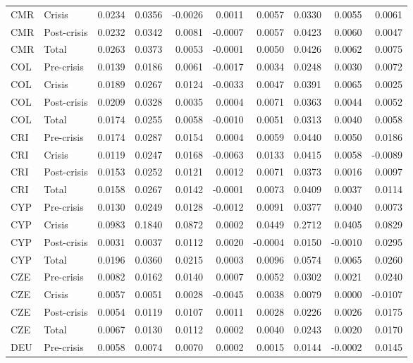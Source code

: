 \begin{longtable}[t]{llrrrrrrrr}
CMR & Crisis & 0.0234 & 0.0356 & -0.0026 & 0.0011 & 0.0057 & 0.0330 & 0.0055 & 0.0061\\
CMR & Post-crisis & 0.0232 & 0.0342 & 0.0081 & -0.0007 & 0.0057 & 0.0423 & 0.0060 & 0.0047\\
CMR & Total & 0.0263 & 0.0373 & 0.0053 & -0.0001 & 0.0050 & 0.0426 & 0.0062 & 0.0075\\
\addlinespace
COL & Pre-crisis & 0.0139 & 0.0186 & 0.0061 & -0.0017 & 0.0034 & 0.0248 & 0.0030 & 0.0072\\
COL & Crisis & 0.0189 & 0.0267 & 0.0124 & -0.0033 & 0.0047 & 0.0391 & 0.0065 & 0.0025\\
COL & Post-crisis & 0.0209 & 0.0328 & 0.0035 & 0.0004 & 0.0071 & 0.0363 & 0.0044 & 0.0052\\
COL & Total & 0.0174 & 0.0255 & 0.0058 & -0.0010 & 0.0051 & 0.0313 & 0.0040 & 0.0058\\
CRI & Pre-crisis & 0.0174 & 0.0287 & 0.0154 & 0.0004 & 0.0059 & 0.0440 & 0.0050 & 0.0186\\
\addlinespace
CRI & Crisis & 0.0119 & 0.0247 & 0.0168 & -0.0063 & 0.0133 & 0.0415 & 0.0058 & -0.0089\\
CRI & Post-crisis & 0.0153 & 0.0252 & 0.0121 & 0.0012 & 0.0071 & 0.0373 & 0.0016 & 0.0097\\
CRI & Total & 0.0158 & 0.0267 & 0.0142 & -0.0001 & 0.0073 & 0.0409 & 0.0037 & 0.0114\\
CYP & Pre-crisis & 0.0130 & 0.0249 & 0.0128 & -0.0012 & 0.0091 & 0.0377 & 0.0040 & 0.0073\\
CYP & Crisis & 0.0983 & 0.1840 & 0.0872 & 0.0002 & 0.0449 & 0.2712 & 0.0405 & 0.0829\\
\addlinespace
CYP & Post-crisis & 0.0031 & 0.0037 & 0.0112 & 0.0020 & -0.0004 & 0.0150 & -0.0010 & 0.0295\\
CYP & Total & 0.0196 & 0.0360 & 0.0215 & 0.0003 & 0.0096 & 0.0574 & 0.0065 & 0.0260\\
CZE & Pre-crisis & 0.0082 & 0.0162 & 0.0140 & 0.0007 & 0.0052 & 0.0302 & 0.0021 & 0.0240\\
CZE & Crisis & 0.0057 & 0.0051 & 0.0028 & -0.0045 & 0.0038 & 0.0079 & 0.0000 & -0.0107\\
CZE & Post-crisis & 0.0054 & 0.0119 & 0.0107 & 0.0011 & 0.0028 & 0.0226 & 0.0026 & 0.0175\\
\addlinespace
CZE & Total & 0.0067 & 0.0130 & 0.0112 & 0.0002 & 0.0040 & 0.0243 & 0.0020 & 0.0170\\
DEU & Pre-crisis & 0.0058 & 0.0074 & 0.0070 & 0.0002 & 0.0015 & 0.0144 & -0.0002 & 0.0145\\

\end{longtable}
